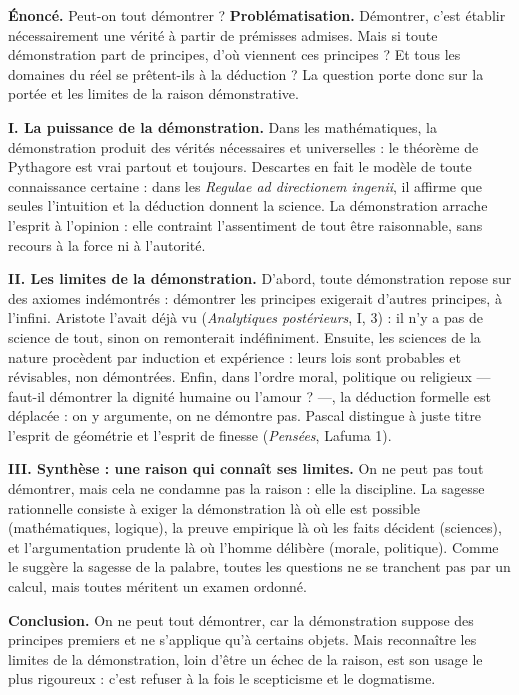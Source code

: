 \documentclass[11pt]{article}
\begin{document}
\begin{exoresolu}
\textbf{Énoncé.} Peut-on tout démontrer ?
\tcblower
\textbf{Problématisation.} Démontrer, c'est établir nécessairement une vérité à partir de prémisses admises. Mais si toute démonstration part de principes, d'où viennent ces principes ? Et tous les domaines du réel se prêtent-ils à la déduction ? La question porte donc sur la portée et les limites de la raison démonstrative.

\textbf{I. La puissance de la démonstration.} Dans les mathématiques, la démonstration produit des vérités nécessaires et universelles : le théorème de Pythagore est vrai partout et toujours. Descartes en fait le modèle de toute connaissance certaine : dans les \emph{Regulae ad directionem ingenii}, il affirme que seules l'intuition et la déduction donnent la science. La démonstration arrache l'esprit à l'opinion : elle contraint l'assentiment de tout être raisonnable, sans recours à la force ni à l'autorité.

\textbf{II. Les limites de la démonstration.} D'abord, toute démonstration repose sur des axiomes indémontrés : démontrer les principes exigerait d'autres principes, à l'infini. Aristote l'avait déjà vu (\emph{Analytiques postérieurs}, I, 3) : il n'y a pas de science de tout, sinon on remonterait indéfiniment. Ensuite, les sciences de la nature procèdent par induction et expérience : leurs lois sont probables et révisables, non démontrées. Enfin, dans l'ordre moral, politique ou religieux — faut-il démontrer la dignité humaine ou l'amour ? —, la déduction formelle est déplacée : on y argumente, on ne démontre pas. Pascal distingue à juste titre l'esprit de géométrie et l'esprit de finesse (\emph{Pensées}, Lafuma 1).

\textbf{III. Synthèse : une raison qui connaît ses limites.} On ne peut pas tout démontrer, mais cela ne condamne pas la raison : elle la discipline. La sagesse rationnelle consiste à exiger la démonstration là où elle est possible (mathématiques, logique), la preuve empirique là où les faits décident (sciences), et l'argumentation prudente là où l'homme délibère (morale, politique). Comme le suggère la sagesse de la palabre, toutes les questions ne se tranchent pas par un calcul, mais toutes méritent un examen ordonné.

\textbf{Conclusion.} On ne peut tout démontrer, car la démonstration suppose des principes premiers et ne s'applique qu'à certains objets. Mais reconnaître les limites de la démonstration, loin d'être un échec de la raison, est son usage le plus rigoureux : c'est refuser à la fois le scepticisme et le dogmatisme.
\end{exoresolu}
\end{document}
